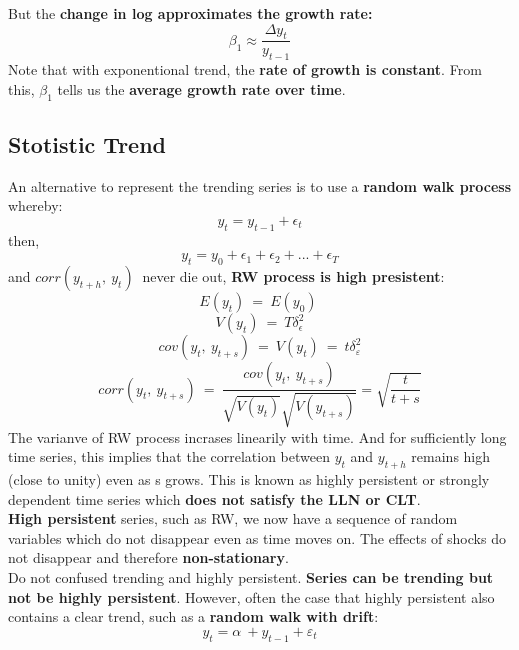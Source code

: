 \documentclass[12pt]{article}
\begin{document}
But the \textbf{change in log approximates the growth rate:}
$$\beta_1\approx\frac{\Delta y_t}{y_{t-1}}$$
Note that with exponentional trend, the \textbf{rate of growth is constant}. From this, $\beta_1$ tells us the \textbf{average growth rate over time}. 

















\newpage
{\color{RoyalBlue}
\subsection{Stotistic Trend}}
An alternative to represent the trending series is to use a \textbf{random walk process} whereby:
$$y_t = y_{t-1} +\epsilon_t$$
then,
$$y_t = y_0 +\epsilon_1 + \epsilon_2 + ...+ \epsilon_T$$
and $corr\left(y_{t+h},\ y_t\right)\ $ never die out, \textbf{ RW process is high presistent}:
$$E\left(y_t\right)\ =\ E\left(y_0\right)\ $$
$$  V\left(y_t\right)\ =\ T\delta _{\epsilon }^2 $$
$$cov\left(y_t,\ y_{t+s}\right)\ =\ V\left(y_t\right)\ =\ t\delta_{\varepsilon}^2$$
$$corr\left(y_t,\ y_{t+s}\right)\ =\ \frac{cov\left(y_t,\ y_{t+s}\right)}{\sqrt{V\left(y_t\right)}\sqrt{V\left(y_{t+s}\right)}}=\sqrt{\frac{t}{t+s}}$$
The varianve of RW process incrases linearily with time. And for sufficiently long time series, this implies that the correlation between $y_t$ and $y_{t+h}$ remains high (close to unity) even as s grows. This is known as highly persistent or strongly dependent time series which \textbf{does not satisfy the LLN or CLT}.
\\

\noindent
\textbf{High persistent} series, such as RW, we now have a sequence of random variables which do not disappear even as time moves on. The effects of shocks do not disappear and therefore \textbf{non-stationary}. 
\\

Do not confused trending and highly persistent. \textbf{Series can be trending but not be highly persistent}. However, often the case that highly persistent also contains a clear trend, such as a \textbf{random walk with drift}:
$$y_t=\alpha \ +y_{t-1}+\varepsilon _t$$
\end{document}
